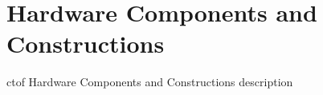 \section{Hardware Components and Constructions}

ctof Hardware Components and Constructions description

